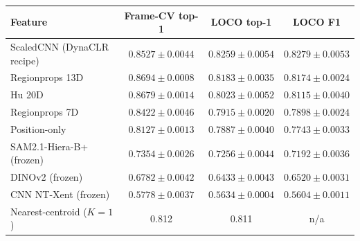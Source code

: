 \begin{frame}
  \centering
  \scriptsize
  \renewcommand{\arraystretch}{1.12}
  \setlength{\tabcolsep}{1.4mm}
  \begin{tabular}{@{}p{48mm}ccc@{}}
    \toprule
    \textbf{Feature} & \textbf{Frame-CV top-1} & \textbf{LOCO top-1} &
    \textbf{LOCO F1} \\
    \midrule
    ScaledCNN (DynaCLR recipe) & $0.8527 \pm 0.0044$ & $0.8259 \pm 0.0054$ &
    $0.8279 \pm 0.0053$ \\
    Regionprops 13D & $0.8694 \pm 0.0008$ & $0.8183 \pm 0.0035$ &
    $0.8174 \pm 0.0024$ \\
    Hu 20D & $0.8679 \pm 0.0014$ & $0.8023 \pm 0.0052$ &
    $0.8115 \pm 0.0040$ \\
    Regionprops 7D & $0.8422 \pm 0.0046$ & $0.7915 \pm 0.0020$ &
    $0.7898 \pm 0.0024$ \\
    Position-only & $0.8127 \pm 0.0013$ & $0.7887 \pm 0.0040$ &
    $0.7743 \pm 0.0033$ \\
    SAM2.1-Hiera-B+ (frozen) & $0.7354 \pm 0.0026$ & $0.7256 \pm 0.0044$ &
    $0.7192 \pm 0.0036$ \\
    DINOv2 (frozen) & $0.6782 \pm 0.0042$ & $0.6433 \pm 0.0043$ &
    $0.6520 \pm 0.0031$ \\
    CNN NT-Xent (frozen) & $0.5778 \pm 0.0037$ & $0.5634 \pm 0.0004$ &
    $0.5604 \pm 0.0011$ \\
    \midrule
    Nearest-centroid ($K{=}1$) & 0.812 & 0.811 & n/a \\
    \bottomrule
  \end{tabular}


\end{frame}


